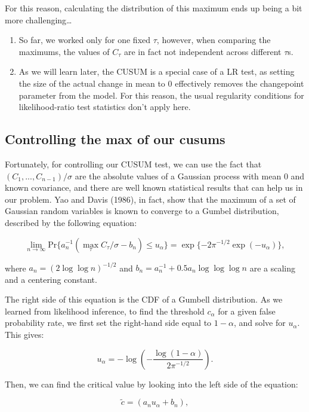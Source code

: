 \documentclass[
  letterpaper,
  DIV=11,
  numbers=noendperiod]{scrreprt}
\providecommand{\tightlist}{%
  \setlength{\itemsep}{0pt}\setlength{\parskip}{0pt}}\usepackage{longtable,booktabs,array}
\begin{document}
For this reason, calculating the distribution of this maximum ends up
being a bit more challenging\ldots{}

\begin{enumerate}
\def\labelenumi{\arabic{enumi}.}
\tightlist
\item
  So far, we worked only for one fixed \(\tau\), however, when comparing
  the maximums, the values of \(C_\tau\) are in fact not independent
  across different \(\tau\)s.
\item
  As we will learn later, the CUSUM is a special case of a LR test, as
  setting the size of the actual change in mean to 0 effectively removes
  the changepoint parameter from the model. For this reason, the usual
  regularity conditions for likelihood-ratio test statistics don't apply
  here.
\end{enumerate}

\subsection{Controlling the max of our
cusums}\label{controlling-the-max-of-our-cusums}

Fortunately, for controlling our CUSUM test, we can use the fact that
\((C_1, ..., C_{n-1})/ \sigma\) are the absolute values of a Gaussian
process with mean 0 and known covariance, and there are well known
statistical results that can help us in our problem. Yao and Davis
(1986), in fact, show that the maximum of a set of Gaussian random
variables is known to converge to a Gumbel distribution, described by
the following equation:

\[
\lim_{n→\infty} \text{Pr}\{a_n^{-1}(\max_\tau C_\tau/\sigma - b_n) ≤ u_\alpha\} = \exp\{-2π^{-1/2}\exp(-u_\alpha)\},
\]

where \(a_n = (2 \log \log n)^{-1/2}\) and
\(b_n = a_n^{-1} + 0.5a_n \log \log \log n\) are a scaling and a
centering constant.

The right side of this equation is the CDF of a Gumbell distribution. As
we learned from likelihood inference, to find the threshold
\(c_{\alpha}\) for a given false probability rate, we first set the
right-hand side equal to \(1 - \alpha\), and solve for \(u_\alpha\).
This gives:

\[
u_\alpha = -\log\left( -\frac{\log(1-\alpha)}{2\pi^{-1/2}} \right).
\]

Then, we can find the critical value by looking into the left side of
the equation:

\[
\tilde{c} = (a_n u_\alpha + b_n),
\]
\end{document}
